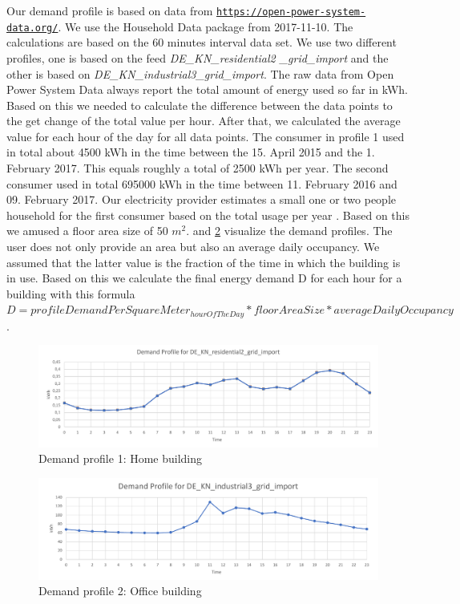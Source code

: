 Our demand profile is based on data from \texttt{\url{https://open-power-system-data.org/}}. We use the \glqq{}Household Data\grqq{} package from 2017-11-10. The calculations are based on the 60 minutes interval data set. We use two different profiles, one is based on the feed \textit{DE\_KN\_residential2 \_grid\_import} and the other is based on \textit{DE\_KN\_industrial3\_grid\_import}. The raw data from Open Power System Data always report the total amount of energy used so far in kWh. Based on this we needed to calculate the difference between the data points to the get change of the total value per hour. After that, we calculated the average value for each hour of the day for all data points. The consumer in profile 1 used in total about 4500 kWh in the time between the 15. April 2015 and the 1. February 2017. This equals roughly a total of 2500 kWh per year. The second consumer used in total 695000 kWh in the time between 11. February 2016 and 09. February 2017. Our electricity provider estimates a small one or two people household for the first consumer based on the total usage per year \cite{enbw}. Based on this we amused a floor area size of 50 $m^{2}$.  and \cref{fig:profile2} visualize the demand profiles. The user does not only provide an area but also an average daily occupancy. We assumed that the latter value is the fraction of the time in which the building is in use. Based on this we calculate the final energy demand D for each hour for a building with this formula $ D = profileDemandPerSquareMeter_{hourOfTheDay} * floorAreaSize * averageDailyOccupancy$. 

\begin{figure}[!h]
	\centering
	\includegraphics[width=1.00\textwidth]{../figures/profile1.pdf}
	\caption{Demand profile 1: Home building}
	\label{fig:profile1}
\end{figure}

\begin{figure}[!h]
	\centering
	\includegraphics[width=1.00\textwidth]{../figures/profile2.pdf}
	\caption{Demand profile 2: Office building}
	\label{fig:profile2}
\end{figure}
